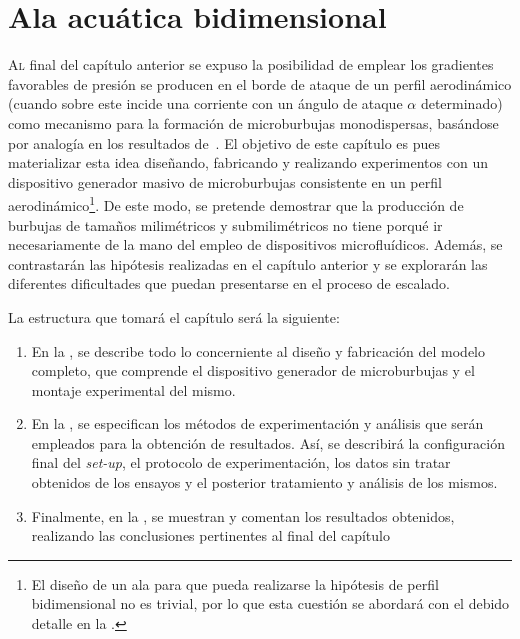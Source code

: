 \chapter{Ala acuática bidimensional}
\pagestyle{esitscCD}
\epigraph{ }{}

\lettrine[lraise=-0.1, lines=2, loversize=0.25]{A}l final del capítulo anterior se expuso la posibilidad de emplear los gradientes favorables de presión se producen en el borde de ataque de un perfil aerodinámico (cuando sobre este incide una corriente con un ángulo de ataque $\alpha$ determinado) como mecanismo para la formación de microburbujas monodispersas, basándose por analogía en los resultados de~\cite{Evangelio2015b}. El objetivo de este capítulo es pues materializar esta idea diseñando, fabricando y realizando experimentos con un dispositivo generador masivo de microburbujas consistente en un perfil aerodinámico\footnote{El diseño de un ala para que pueda realizarse la hipótesis de perfil bidimensional no es trivial, por lo que esta cuestión se abordará con el debido detalle en la .}. De este modo, se pretende  demostrar que la producción de burbujas de tamaños milimétricos y submilimétricos no tiene porqué ir necesariamente de la mano del empleo de dispositivos microfluídicos. Además, se contrastarán las hipótesis realizadas en el capítulo anterior y se explorarán las diferentes dificultades que puedan presentarse en el proceso de escalado. 

La estructura que tomará el capítulo será la siguiente: 
\begin{enumerate}
\item En la , se describe todo lo concerniente al diseño y fabricación del modelo completo, que comprende el dispositivo generador de microburbujas y el montaje experimental del mismo. 
\item En la , se especifican los métodos de experimentación y análisis que serán empleados para la obtención de resultados. Así, se describirá la configuración final del \textit{set-up}, el protocolo de experimentación, los datos sin tratar obtenidos de los ensayos  y el posterior tratamiento y análisis de los mismos.
\item Finalmente, en  la , se muestran y comentan los resultados obtenidos, realizando las conclusiones pertinentes al final del capítulo
\end{enumerate}

